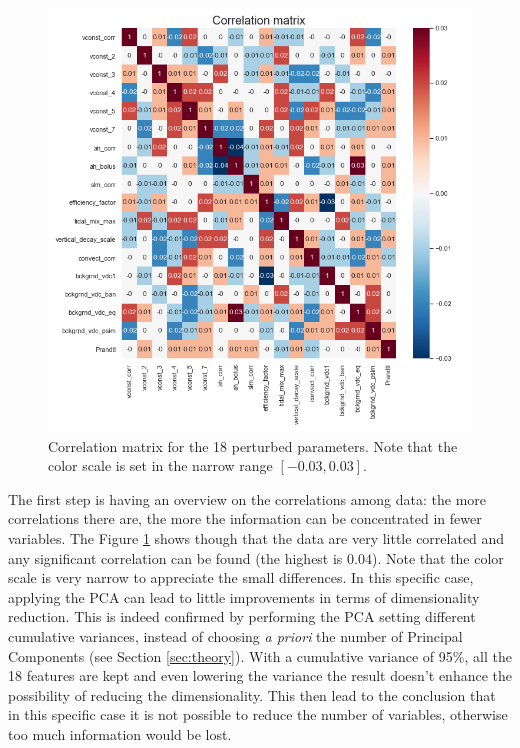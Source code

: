 \documentclass[english,notitlepage,reprint,nofootinbib]{revtex4-1}  %
\begin{document}
\begin{figure}[h]
    \centering 
    \includegraphics[scale=0.3]{dataset/correlationmatrix.png}
    \caption{Correlation matrix for the 18 perturbed parameters. Note that the color scale is set in the narrow range $[-0.03,0.03]$.}
    \label{data:corr}
\end{figure}

The first step is having an overview on the correlations among data: the more correlations there are, the more the information can be concentrated in fewer variables. The Figure \ref{data:corr} shows though that the data are very little correlated and any significant correlation can be found (the highest is $0.04$). Note that the color scale is very narrow to appreciate the small differences. In this specific case, applying the PCA can lead to little improvements in terms of dimensionality reduction. This is indeed confirmed by performing the PCA setting different cumulative variances, instead of choosing \textit{a priori} the number of Principal Components (see Section \ref{sec:theory}). With a cumulative variance of 95\%, all the 18 features are kept and even lowering the variance the result doesn't enhance the possibility of reducing the dimensionality. This then lead to the conclusion that in this specific case it is not possible to reduce the number of variables, otherwise too much information would be lost. 
\end{document}
